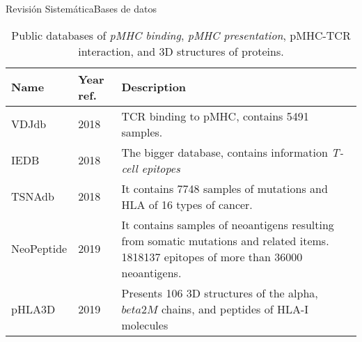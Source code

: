 \documentclass[10pt]{beamer}
\newcommand{\1}{
	\setbeamertemplate{background}{
		\texttt{[image: img/1]}
		\tikz[overlay] \fill[fill opacity=0.75,fill=white] (0,0) rectangle (-\paperwidth,\paperheight);
	}
}
\begin{document}
\begin{frame}{Revisión Sistemática}{Bases de datos}
	
	\fontsize{7pt}{5pt}\selectfont
	
	\begin{table}[]
		\centering
		\caption{Public databases of \textit{pMHC binding}, \textit{pMHC presentation}, pMHC-TCR interaction, and 3D structures of proteins.}		
		\setlength{\tabcolsep}{0.5em} %
		{\renewcommand{\arraystretch}{2}%
			\begin{tabular}{p{1.7cm}p{1.2cm}p{6.5cm}}
				\textbf{Name} & \textbf{Year ref.}                                                                & \textbf{Description}                                                                                                                                                                                      \\ \hline
				VDJdb           & 2018 \cite{shugay2018vdjdb}& TCR binding to pMHC, contains 5491 samples.                                                                                                                                           \\
				IEDB            & 2018 \cite{vita2019immune}                                           & The bigger database, contains information \textit{T-cell epitopes}                                                                                               \\
				TSNAdb          & 2018 \cite{wu2018tsnadb}                                             & It contains 7748 samples of mutations and HLA of 16 types of cancer.                                                                                                                           \\
				NeoPeptide      & 2019 \cite{zhou2019neopeptide}                                       & It contains samples of neoantigens resulting from somatic mutations and related items. 1818137 epitopes of more than 36000 neoantigens.
				\\
				pHLA3D          & 2019 \cite{e2019phla3d}                                              &
				Presents 106 3D structures of the alpha, $beta 2M$ chains, and peptides of HLA-I molecules                                                                                                            \\

\end{tabular}}
\end{table}
\end{frame}
\end{document}

